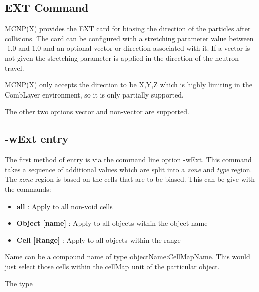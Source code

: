 
\subsection{EXT Command}
\label{ExtCommand}

MCNP(X) provides the EXT card for biasing the direction of the
particles after collisions. The card can be configured with a
stretching parameter value between -1.0 and 1.0 and an optional vector
or direction associated with it. If a vector is not given the
stretching parameter is applied in the direction of the neutron travel.

MCNP(X) only accepts the direction to be X,Y,Z which is highly
limiting in the CombLayer environment, so it is only partially supported.

The other two options vector and non-vector are supported.

\subsection{-wExt entry}

The first method of entry is via the command line option -wExt. This
command takes a sequence of additional values which are split into a
{\it zone} and {\it type} region. The {\it zone} region is based on
the cells that are to be biased. This can be give with the commands:

\begin{itemize}
\item{ {\bf all} : Apply to all non-void cells}
\item{ {\bf Object [name]} : Apply to all objects within the object name}
\item{ {\bf  Cell [Range]} : Apply to all objects within the range  }
\end{itemize}

Name can be a compound name of type objectName:CellMapName. This would
just select those cells within the cellMap unit of the particular
object.

The type
